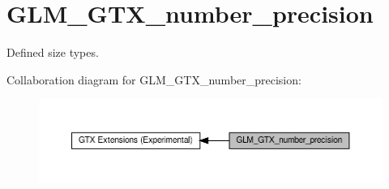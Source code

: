 \hypertarget{group__gtx__number__precision}{}\section{G\+L\+M\+\_\+\+G\+T\+X\+\_\+number\+\_\+precision}
\label{group__gtx__number__precision}


Defined size types.  


Collaboration diagram for G\+L\+M\+\_\+\+G\+T\+X\+\_\+number\+\_\+precision\+:\nopagebreak
\begin{figure}[H]
\begin{center}
\leavevmode
\includegraphics[width=350pt]{group__gtx__number__precision}
\end{center}
\end{figure}
